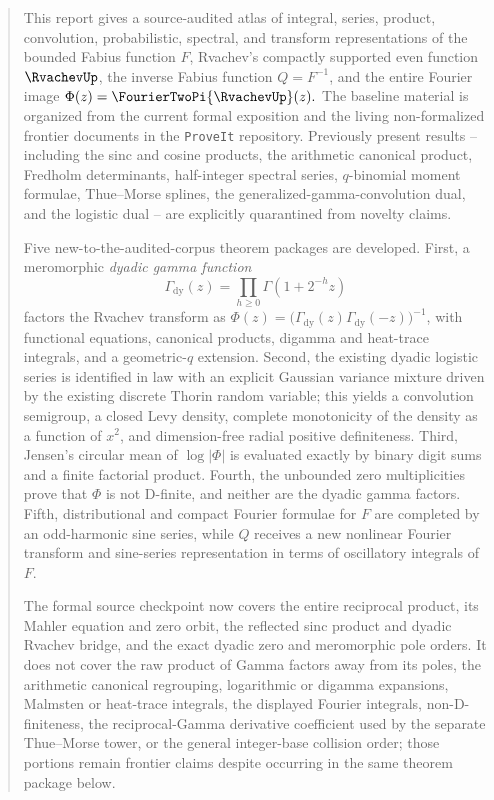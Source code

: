 \documentclass[11pt]{article}
\theoremstyle{definition}
\theoremstyle{remark}
\begin{document}
\begin{abstract}
This report gives a source-audited atlas of integral, series, product, convolution,
probabilistic, spectral, and transform representations of the bounded Fabius function
$F$, Rvachev's compactly supported even function $\RvachevUp$, the inverse Fabius function
$Q=F^{-1}$, and the entire Fourier image
\(
 \Phi(z)=\FourierTwoPi{\RvachevUp}(z).
\)
The baseline material is organized from the current formal exposition and the living
non-formalized frontier documents in the \texttt{ProveIt} repository.  Previously present
results -- including the sinc and cosine products, the arithmetic canonical product,
Fredholm determinants, half-integer spectral series, $q$-binomial moment formulae,
Thue--Morse splines, the generalized-gamma-convolution dual, and the logistic dual -- are
explicitly quarantined from novelty claims.

Five new-to-the-audited-corpus theorem packages are developed.  First, a meromorphic
\emph{dyadic gamma function}
\[
 \Gamma_{\!\mathrm{dy}}(z)=\prod_{h\ge0}\Gamma(1+2^{-h}z)
\]
factors the Rvachev transform as
\(
 \Phi(z)=\bigl(\Gamma_{\!\mathrm{dy}}(z)
 \Gamma_{\!\mathrm{dy}}(-z)\bigr)^{-1}
\), with functional equations, canonical products, digamma and heat-trace integrals, and a
geometric-$q$ extension.  Second, the existing dyadic logistic series is identified in law
with an explicit Gaussian variance mixture driven by the existing discrete Thorin random
variable; this yields a convolution semigroup, a closed Levy density, complete monotonicity
of the density as a function of $x^2$, and dimension-free radial positive definiteness.
Third, Jensen's circular mean of $\log|\Phi|$ is evaluated exactly by binary digit sums and a
finite factorial product.  Fourth, the unbounded zero multiplicities prove that $\Phi$ is
not D-finite, and neither are the dyadic gamma factors.  Fifth, distributional and compact
Fourier formulae for $F$ are completed by an odd-harmonic sine series, while $Q$ receives a
new nonlinear Fourier transform and sine-series representation in terms of oscillatory
integrals of $F$.

The formal source checkpoint
 now covers the entire reciprocal product,
its Mahler equation and zero orbit, the reflected sinc product and dyadic Rvachev bridge, and
the exact dyadic zero and meromorphic pole orders.  It does not cover the raw product of
Gamma factors away from its poles, the arithmetic canonical regrouping, logarithmic or
digamma expansions, Malmsten or heat-trace integrals, the displayed Fourier integrals,
non-D-finiteness, the reciprocal-Gamma derivative coefficient used by the separate
Thue--Morse tower, or the general integer-base collision order; those portions remain
frontier claims despite occurring in the same theorem package below.


\end{abstract}
\end{document}
